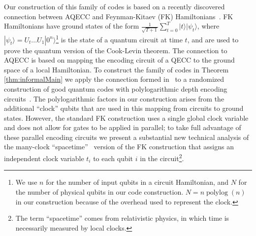 \documentclass[11pt,letterpaper]{article}
\theoremstyle{definition}
\theoremstyle{remark}
\DeclareMathOperator{\polylog}{polylog}
\numberwithin{equation}{section}
\theoremstyle{definition}
\begin{document}
Our construction of this family of codes is based on a recently discovered connection between AQECC and Feynman-Kitaev (FK) Hamiltonians~\cite{nirkhe_et_al:LIPIcs:2018:9095}.  FK Hamiltonians have ground states of the form $\frac{1}{\sqrt{T+1}} \sum_{t = 0}^T |t\rangle |\psi_t\rangle$, where $|\psi_t\rangle = U_t ... U_1 |0^n\rangle$\footnote{We use $n$ for the number of input qubits in a circuit Hamiltonian, and $N$ for the number of physical qubits in our code construction. $N = n\polylog(n)$ in our construction because of the overhead used to represent the clock.} is the state of a quantum circuit at time $t$, and are used to prove the quantum version of the Cook-Levin theorem.   The connection to AQECC is based on mapping the encoding circuit of a QECC to the ground space of a local Hamiltonian.  To construct the family of codes in Theorem \ref{thm:informalMain} we apply the connection formed in~\cite{nirkhe_et_al:LIPIcs:2018:9095} to a randomized construction of good quantum codes with polylogarithmic depth encoding circuits~\cite{brown2013short}.   The polylogarithmic factors in our construction arises from the additional ``clock'' qubits that are used in this mapping from circuits to  ground states.  However, the standard FK construction uses a single global clock variable and does not allow for gates to be applied in parallel; to take full advantage of these parallel encoding circuits we present a substantial new technical analysis of the many-clock ``spacetime''~\cite{mizel2007simple, breuckmann2014space} version of the FK construction that assigns an independent clock variable $t_i$ to each qubit $i$ in the circuit\footnote{The term ``spacetime'' comes from relativistic physics, in which time is necessarily measured by local clocks.}.  
\end{document}
